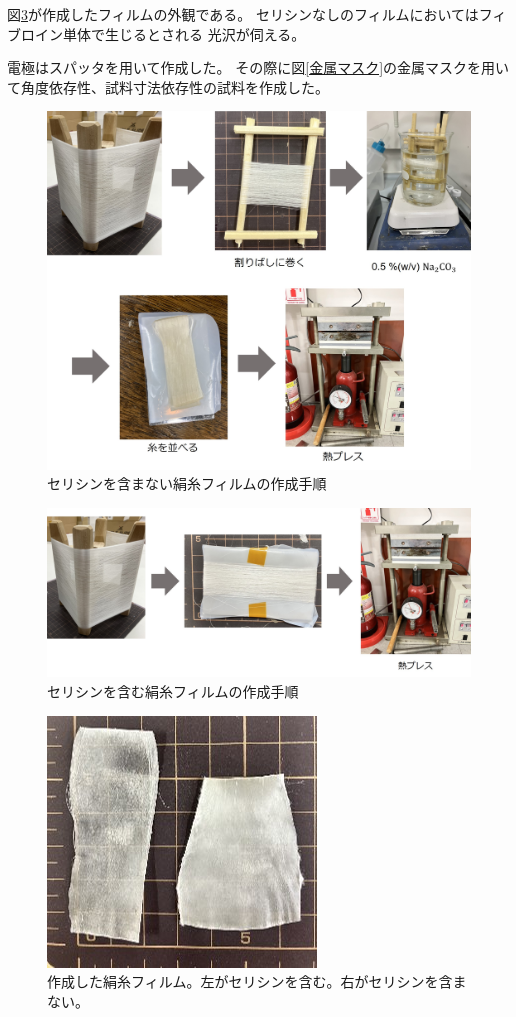 \documentclass[dvipdfmx,12pt,a4paper]{jreport}
\begin{document}
		図\ref{試料外観}が作成したフィルムの外観である。
		セリシンなしのフィルムにおいてはフィブロイン単体で生じるとされる
		光沢が伺える。

		電極はスパッタを用いて作成した。
		その際に図\ref{金属マスク}の金属マスクを用いて角度依存性、試料寸法依存性の試料を作成した。

		\begin{figure}[h]
			\centering
			\includegraphics[scale=0.65]{試料作製手順.jpg}
			\caption{セリシンを含まない絹糸フィルムの作成手順}
			\label{セリシンを含まない試料作製手順}
		\end{figure}
		\newpage
		\begin{figure}[h]
			\centering
			\includegraphics[width=\linewidth]{試料作製手順2.jpg}
			\caption{セリシンを含む絹糸フィルムの作成手順}
			\label{セリシンを含むフィルム作成手順}
		\end{figure}
		\begin{figure}[h]
			\centering
			\includegraphics[scale=1]{試料.jpg}
			\caption{作成した絹糸フィルム。左がセリシンを含む。右がセリシンを含まない。}
			\label{試料外観}
		\end{figure}
\end{document}
